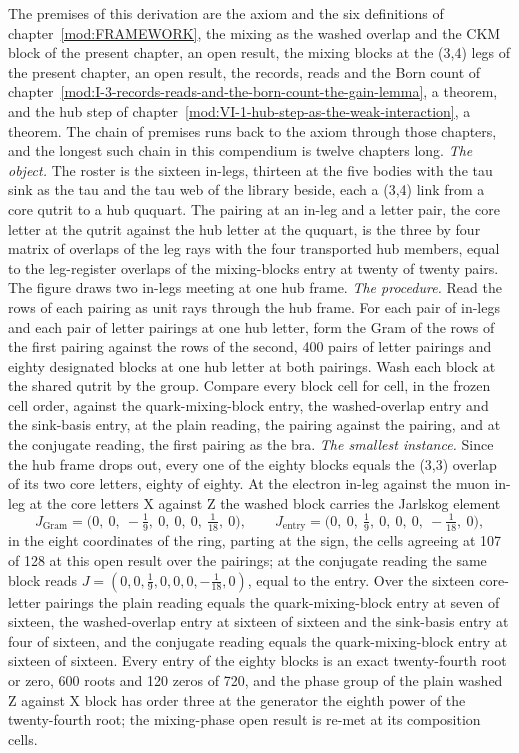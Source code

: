 \begin{chproof}
The premises of this derivation are the axiom and the six definitions of chapter~\ref{mod:FRAMEWORK}, the mixing as the washed overlap and the CKM block of the present chapter, an open result, the mixing blocks at the (3,4) legs of the present chapter, an open result, the records, reads and the Born count of chapter~\ref{mod:I-3-records-reads-and-the-born-count-the-gain-lemma}, a theorem, and the hub step of chapter~\ref{mod:VI-1-hub-step-as-the-weak-interaction}, a theorem. The chain of premises runs back to the axiom through those chapters, and the longest such chain in this compendium is twelve chapters long.
\textit{The object.} The roster is the sixteen in-legs, thirteen at the five bodies with the tau sink as the tau and the tau web of the library beside, each a (3,4) link from a core qutrit to a hub ququart. The pairing at an in-leg and a letter pair, the core letter at the qutrit against the hub letter at the ququart, is the three by four matrix of overlaps of the leg rays with the four transported hub members, equal to the leg-register overlaps of the mixing-blocks entry at twenty of twenty pairs. The figure draws two in-legs meeting at one hub frame.
\textit{The procedure.} Read the rows of each pairing as unit rays through the hub frame. For each pair of in-legs and each pair of letter pairings at one hub letter, form the Gram of the rows of the first pairing against the rows of the second, 400 pairs of letter pairings and eighty designated blocks at one hub letter at both pairings. Wash each block at the shared qutrit by the group. Compare every block cell for cell, in the frozen cell order, against the quark-mixing-block entry, the washed-overlap entry and the sink-basis entry, at the plain reading, the pairing against the pairing, and at the conjugate reading, the first pairing as the bra.
\textit{The smallest instance.} Since the hub frame drops out, every one of the eighty blocks equals the (3,3) overlap of its two core letters, eighty of eighty. At the electron in-leg against the muon in-leg at the core letters X against Z the washed block carries the Jarlskog element
\begin{equation} J_{\mathrm{Gram}} = \big(0,\ 0,\ -\tfrac{1}{9},\ 0,\ 0,\ 0,\ \tfrac{1}{18},\ 0\big), \qquad J_{\mathrm{entry}} = \big(0,\ 0,\ \tfrac{1}{9},\ 0,\ 0,\ 0,\ -\tfrac{1}{18},\ 0\big), \end{equation}
in the eight coordinates of the ring, parting at the sign, the cells agreeing at 107 of 128 at this open result over the pairings; at the conjugate reading the same block reads $J = (0, 0, \tfrac{1}{9}, 0, 0, 0, -\tfrac{1}{18}, 0)$, equal to the entry. Over the sixteen core-letter pairings the plain reading equals the quark-mixing-block entry at seven of sixteen, the washed-overlap entry at sixteen of sixteen and the sink-basis entry at four of sixteen, and the conjugate reading equals the quark-mixing-block entry at sixteen of sixteen. Every entry of the eighty blocks is an exact twenty-fourth root or zero, 600 roots and 120 zeros of 720, and the phase group of the plain washed Z against X block has order three at the generator the eighth power of the twenty-fourth root; the mixing-phase open result is re-met at its composition cells.

\end{chproof}
